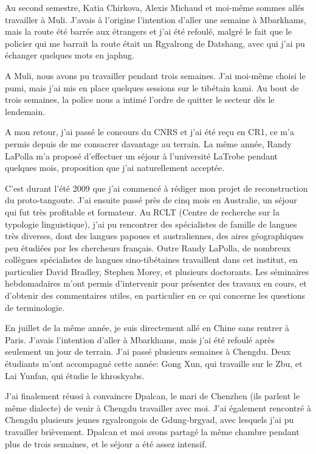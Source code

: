 \documentclass[oldfontcommands,oneside,a4paper,11pt]{memoir}
\begin{document}
Au second semestre, Katia Chirkova, Alexis Michaud et moi-même sommes allés travailler à Muli. J'avais à l'origine l'intention d'aller une semaine à Mbarkhams, mais la route été barrée aux étrangers et j'ai été refoulé, malgré le fait que le policier qui me barrait la route était un Rgyalrong de Datshang, avec qui j'ai pu échanger quelques mots en japhug.

A Muli, nous avons pu travailler pendant trois semaines. J'ai moi-même choisi le pumi, mais j'ai mis en place quelques sessions sur le tibétain kami. Au bout de trois semaines, la police nous a intimé l'ordre de quitter le secteur dès le lendemain.  

A mon retour, j'ai passé le concours du CNRS et j'ai été reçu en CR1, ce m'a permis depuis de me consacrer davantage au terrain. La même année, Randy LaPolla m'a proposé d'effectuer un séjour à l'université LaTrobe pendant quelques mois, proposition que j'ai naturellement acceptée.

C'est durant l'été 2009 que j'ai commencé à rédiger mon projet de reconstruction du proto-tangoute. J'ai ensuite passé près de cinq mois en Australie, un séjour qui fut très profitable et formateur. Au RCLT (Centre de recherche sur la typologie linguistique), j'ai pu rencontrer des spécialistes de famille de langues très diverses, dont des langues papoues et australiennes, des aires géographiques peu étudiées par les chercheurs français. Outre Randy LaPolla, de nombreux collègues spécialistes de langues sino-tibétaines travaillent dans cet institut, en particulier David Bradley, Stephen Morey, et plusieurs doctorants. Les séminaires hebdomadaires m'ont permis d'intervenir pour présenter des travaux en cours, et d'obtenir des commentaires utiles, en particulier en ce qui concerne les questions de terminologie.

En juillet de la même année, je suis directement allé en Chine sans rentrer à Paris. J'avais l'intention d'aller à Mbarkhams, mais   j'ai été refoulé après seulement un jour de terrain. J'ai passé plusieurs semaines  à Chengdu. Deux étudiants m'ont accompagné cette année: Gong Xun, qui travaille sur le Zbu, et Lai Yunfan, qui étudie le khroskyabs.

J'ai finalement réussi à convaincre Dpalcan, le mari de Chenzhen (ils parlent le même dialecte) de venir à Chengdu travailler avec moi. J'ai également rencontré à Chengdu plusieurs jeunes rgyalrongois de Gdung-brgyad, avec lesquels j'ai pu travailler brièvement. Dpalcan et moi avons partagé la même chambre pendant plus de trois semaines, et le séjour a été assez intensif.  
\end{document}
